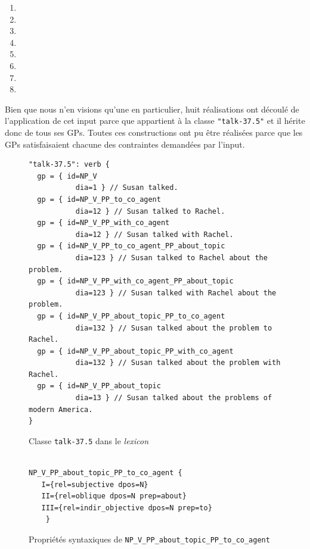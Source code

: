 \begin{enumerate}
  \item {}
  \item {}
  \item {}
  \item {}
  \item {}
  \item {}
  \item {}
  \item {}
\end{enumerate}

Bien que nous n'en visions qu'une en particulier, huit réalisations ont découlé de l'application de cet input parce que  appartient à la classe \texttt{"talk-37.5"} et il hérite donc de tous ses \acp{GP}. Toutes ces constructions ont pu être réalisées parce que les \acp{GP} satisfaisaient chacune des contraintes demandées par l'input.

\begin{figure}[htb]
  \caption{Classe \texttt{talk-37.5} dans le \emph{lexicon}}
	\label{}
\begin{lstlisting}[language=mate]
"talk-37.5": verb {
  gp = { id=NP_V
	       dia=1 } // Susan talked.
  gp = { id=NP_V_PP_to_co_agent
	       dia=12 } // Susan talked to Rachel.
  gp = { id=NP_V_PP_with_co_agent
	       dia=12 } // Susan talked with Rachel.
  gp = { id=NP_V_PP_to_co_agent_PP_about_topic
	       dia=123 } // Susan talked to Rachel about the problem.
  gp = { id=NP_V_PP_with_co_agent_PP_about_topic
	       dia=123 } // Susan talked with Rachel about the problem.
  gp = { id=NP_V_PP_about_topic_PP_to_co_agent
	       dia=132 } // Susan talked about the problem to Rachel.
  gp = { id=NP_V_PP_about_topic_PP_with_co_agent
	       dia=132 } // Susan talked about the problem with Rachel.
  gp = { id=NP_V_PP_about_topic
	       dia=13 } // Susan talked about the problems of modern America.
}
\end{lstlisting}
\end{figure}

\begin{figure}[htb]
  \caption{Propriétés syntaxiques de \texttt{NP\_V\_PP\_about\_topic\_PP\_to\_co\_agent}}
	\label{gpexemple}
\begin{lstlisting}[language=mate]

NP_V_PP_about_topic_PP_to_co_agent {
   I={rel=subjective dpos=N}
   II={rel=oblique dpos=N prep=about}
   III={rel=indir_objective dpos=N prep=to}
	}
\end{lstlisting}
\end{figure}

